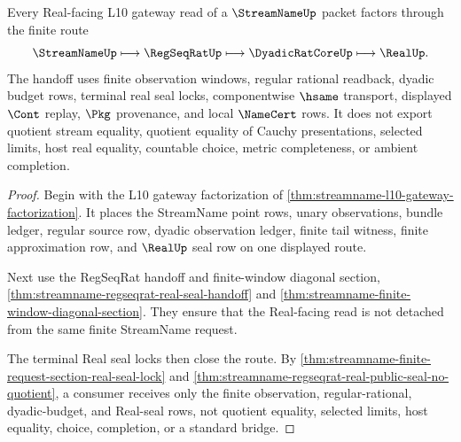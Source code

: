 \begin{theorem}
\label{thm:streamname-l10-gateway-real-regseqrat-handoff}
Every Real-facing L10 gateway read of a $\StreamNameUp$ packet factors through the finite route
$$
\StreamNameUp
\longmapsto
\RegSeqRatUp
\longmapsto
\DyadicRatCoreUp
\longmapsto
\RealUp .
$$
The handoff uses finite observation windows, regular rational readback, dyadic budget rows, terminal real seal locks, componentwise $\hsame$ transport, displayed $\Cont$ replay, $\Pkg$ provenance, and local $\NameCert$ rows. It does not export quotient stream equality, quotient equality of Cauchy presentations, selected limits, host real equality, countable choice, metric completeness, or ambient completion.
\end{theorem}
\begin{proof}
Begin with the L10 gateway factorization of \autoref{thm:streamname-l10-gateway-factorization}. It places the StreamName point rows, unary observations, bundle ledger, regular source row, dyadic observation ledger, finite tail witness, finite approximation row, and $\RealUp$ seal row on one displayed route.

Next use the RegSeqRat handoff and finite-window diagonal section, \autoref{thm:streamname-regseqrat-real-seal-handoff} and \autoref{thm:streamname-finite-window-diagonal-section}. They ensure that the Real-facing read is not detached from the same finite StreamName request.

The terminal Real seal locks then close the route. By \autoref{thm:streamname-finite-request-section-real-seal-lock} and \autoref{thm:streamname-regseqrat-real-public-seal-no-quotient}, a consumer receives only the finite observation, regular-rational, dyadic-budget, and Real-seal rows, not quotient equality, selected limits, host equality, choice, completion, or a standard bridge.
\end{proof}

